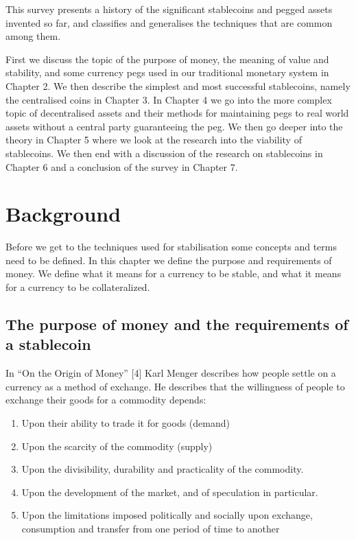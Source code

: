 \documentclass[english,]{IEEEtran}
\providecommand{\tightlist}{%
  \setlength{\itemsep}{0pt}\setlength{\parskip}{0pt}}
\begin{document}
This survey presents a history of the significant stablecoins and pegged
assets invented so far, and classifies and generalises the techniques
that are common among them.

First we discuss the topic of the purpose of money, the meaning of value
and stability, and some currency pegs used in our traditional monetary
system in Chapter 2. We then describe the simplest and most successful
stablecoins, namely the centralised coins in Chapter 3. In Chapter 4 we
go into the more complex topic of decentralised assets and their methods
for maintaining pegs to real world assets without a central party
guaranteeing the peg. We then go deeper into the theory in Chapter 5
where we look at the research into the viability of stablecoins. We then
end with a discussion of the research on stablecoins in Chapter 6 and a
conclusion of the survey in Chapter 7.

\hypertarget{background}{%
\section{Background}\label{background}}

Before we get to the techniques used for stabilisation some concepts and
terms need to be defined. In this chapter we define the purpose and
requirements of money. We define what it means for a currency to be
stable, and what it means for a currency to be collateralized.

\hypertarget{the-purpose-of-money-and-the-requirements-of-a-stablecoin}{%
\subsection{The purpose of money and the requirements of a
stablecoin}\label{the-purpose-of-money-and-the-requirements-of-a-stablecoin}}

In ``On the Origin of Money'' {[}4{]} Karl Menger describes how people
settle on a currency as a method of exchange. He describes that the
willingness of people to exchange their goods for a commodity depends:

\begin{enumerate}
\def\labelenumi{\arabic{enumi}.}
\tightlist
\item
  Upon their ability to trade it for goods (demand)
\item
  Upon the scarcity of the commodity (supply)
\item
  Upon the divisibility, durability and practicality of the commodity.
\item
  Upon the development of the market, and of speculation in particular.
\item
  Upon the limitations imposed politically and socially upon exchange,
  consumption and transfer from one period of time to another
\end{enumerate}
\end{document}
